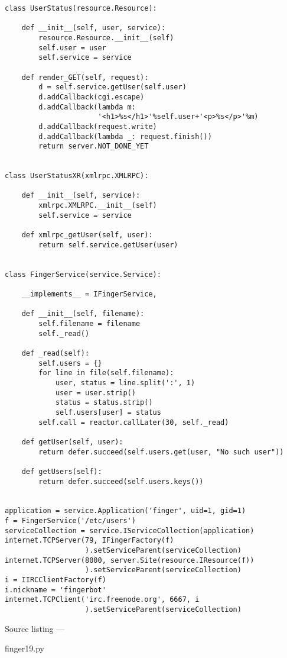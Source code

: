 \begin{verbatim}
class UserStatus(resource.Resource):

    def __init__(self, user, service):
        resource.Resource.__init__(self)
        self.user = user
        self.service = service

    def render_GET(self, request):
        d = self.service.getUser(self.user)
        d.addCallback(cgi.escape)
        d.addCallback(lambda m:
                      '<h1>%s</h1>'%self.user+'<p>%s</p>'%m)
        d.addCallback(request.write)
        d.addCallback(lambda _: request.finish())
        return server.NOT_DONE_YET


class UserStatusXR(xmlrpc.XMLRPC):

    def __init__(self, service):
        xmlrpc.XMLRPC.__init__(self)
        self.service = service

    def xmlrpc_getUser(self, user):
        return self.service.getUser(user)


class FingerService(service.Service):

    __implements__ = IFingerService,

    def __init__(self, filename):
        self.filename = filename
        self._read()

    def _read(self):
        self.users = {}
        for line in file(self.filename):
            user, status = line.split(':', 1)
            user = user.strip()
            status = status.strip()
            self.users[user] = status
        self.call = reactor.callLater(30, self._read)

    def getUser(self, user):
        return defer.succeed(self.users.get(user, "No such user"))

    def getUsers(self):
        return defer.succeed(self.users.keys())


application = service.Application('finger', uid=1, gid=1)
f = FingerService('/etc/users')
serviceCollection = service.IServiceCollection(application)
internet.TCPServer(79, IFingerFactory(f)
                   ).setServiceParent(serviceCollection)
internet.TCPServer(8000, server.Site(resource.IResource(f))
                   ).setServiceParent(serviceCollection)
i = IIRCClientFactory(f)
i.nickname = 'fingerbot'
internet.TCPClient('irc.freenode.org', 6667, i
                   ).setServiceParent(serviceCollection)
\end{verbatim}\parbox[b]{\linewidth}{\begin{center}Source listing --- \begin{em}finger19.py\end{em}\end{center}}

